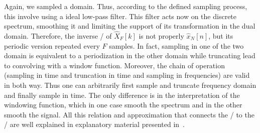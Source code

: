 \mynewline
Again, we sampled a domain. Thus, according to the defined sampling process, this involve using a ideal low-pass filter.
This filter acts now on the discrete spectrum, smoothing it and limiting the support of its transformation in the dual domain.
Therefore, the inverse \DFT/ of $\hat{X}_F[k]$ is not properly $\hat{x}_N[n]$, but its periodic version repeated every $F$ samples.
In fact, sampling in one of the two domain is equivalent to a periodization in the other domain while truncating lead to convolving with a window function.
Moreover, the chain of operation (sampling in time and truncation in time and sampling in frequencies) are valid in both way.
Thus one can arbitrarily first sample and truncate frequency domain and finally sample in time.
The only difference is in the interpretation of the windowing function, which in one case smooth the spectrum and in the other smooth the signal.
All this relation and approximation that connects the \FT/ to the \DFT/ are well explained in explanatory material presented in~.


